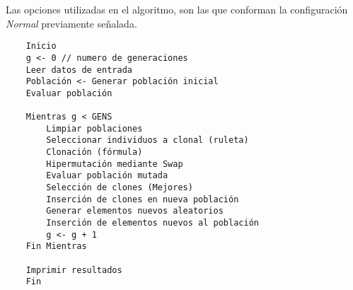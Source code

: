 
Las opciones utilizadas en el algoritmo, son las que conforman la configuración \emph{Normal}
previamente señalada.

\begin{verbatim}
    Inicio
    g <- 0 // numero de generaciones
    Leer datos de entrada
    Población <- Generar población inicial
    Evaluar población

    Mientras g < GENS
        Limpiar poblaciones
        Seleccionar individuos a clonal (ruleta)
        Clonación (fórmula)
        Hipermutación mediante Swap
        Evaluar población mutada
        Selección de clones (Mejores)
        Inserción de clones en nueva población
        Generar elementos nuevos aleatorios
        Inserción de elementos nuevos al población
        g <- g + 1
    Fin Mientras

    Imprimir resultados
    Fin
\end{verbatim}

